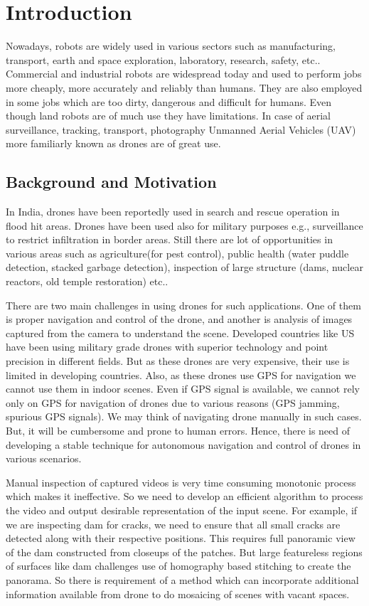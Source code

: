 \chapter{Introduction}
\label{ch:intro}
Nowadays, robots are widely used in various sectors such as manufacturing,
transport, earth and space exploration, laboratory, research, safety, etc..
Commercial and industrial robots are widespread today and used to perform jobs
more cheaply, more accurately and reliably than humans. They are also
employed in some jobs which are too dirty, dangerous and difficult for humans.
Even though land robots are of much use they have limitations. In case of
aerial surveillance, tracking, transport, photography Unmanned Aerial Vehicles
(UAV) more familiarly known as drones are of great use.
\section{Background and Motivation}
In India, drones have been reportedly used in search and rescue operation in
flood hit areas. Drones have been used also for military purposes e.g.,
surveillance to restrict infiltration in border areas. Still there are lot
of opportunities in various areas such as agriculture(for pest control),
public health (water puddle detection, stacked garbage detection), inspection
of large structure (dams, nuclear reactors, old temple restoration) etc..

There are two main challenges in using drones for such applications. One
of them is proper navigation and control of the drone, and another is analysis
of images captured from the camera to understand the scene. Developed countries
like US have been using military grade drones with superior technology and point
precision in different fields. But as these drones are very expensive, their use
is limited in developing countries. Also, as these drones use GPS for navigation
we cannot use them in indoor scenes. Even if GPS signal is available, we cannot
rely only on GPS for navigation of drones due to various reasons (GPS jamming,
spurious GPS signals). We may think of navigating drone manually in such cases.
But, it will be cumbersome and prone to human errors. Hence, there is need of
developing a stable technique for autonomous navigation and control of drones
in various scenarios.

Manual inspection of captured videos is very time consuming monotonic process
which makes it ineffective. So we need to develop an efficient algorithm to
process the video and output desirable representation of the input scene. For
example, if we are inspecting dam for cracks, we need to ensure that all small
cracks are detected along with their respective positions. This requires full
panoramic view of the dam constructed from closeups of the patches. But large
featureless regions of surfaces like dam challenges use of homography based
stitching to create the panorama. So there is requirement of a method which can
incorporate additional information available from drone to do mosaicing of
scenes with vacant spaces.


